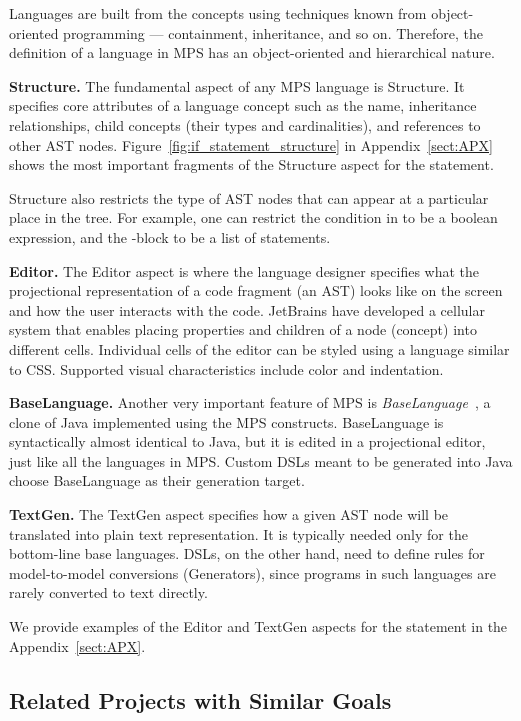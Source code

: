 Languages are built from the concepts using techniques known from object-oriented programming --- containment, inheritance, and so on.
Therefore, the definition of a language in MPS has an object-oriented and hierarchical nature.

\noindent\textbf{Structure.}
The fundamental aspect of any MPS language is Structure.
It specifies core attributes of a language concept such as the name, inheritance relationships, child concepts (their types and cardinalities), and references to other AST nodes.
Figure~\ref{fig:if_statement_structure} in Appendix~\ref{sect:APX} shows the most important fragments of the Structure aspect for the  statement.

Structure also restricts the type of AST nodes that can appear at a particular place in the tree.
For example, one can restrict the condition in  to be a boolean expression, and the -block to be a list of statements.

\noindent\textbf{Editor.}
The Editor aspect is where the language designer specifies what the projectional representation of a code fragment (an AST) looks like on the screen and how the user interacts with the code.
JetBrains have developed a cellular system that enables placing properties and children of a node (concept) into different cells.
Individual cells of the editor can be styled using a language similar to CSS.
Supported visual characteristics include color and indentation.

\noindent\textbf{BaseLanguage.}
Another very important feature of MPS is \emph{BaseLanguage}~\cite{ref:BASELANG}, a clone of Java implemented using the MPS constructs.
BaseLanguage is syntactically almost identical to Java, but it is edited in a projectional editor, just like all the languages in MPS.
Custom DSLs meant to be generated into Java choose BaseLanguage as their generation target.

\noindent\textbf{TextGen.}
The TextGen aspect specifies how a given AST node will be translated into plain text representation.
It is typically needed only for the bottom-line base languages.
DSLs, on the other hand, need to define rules for model-to-model conversions (Generators), since programs in such languages are rarely converted to text directly.

We provide examples of the Editor and TextGen aspects for the  statement in the Appendix~\ref{sect:APX}.

\subsection{Related Projects with Similar Goals}
\label{sect:RELATED}


